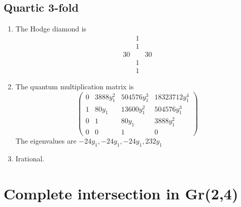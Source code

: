 \documentclass[11pt]{amsart}
\newcounter{num}[section] %
\begin{document}
\subsection{Quartic 3-fold}
\begin{enumerate}
 
\item[1)] The Hodge diamond is 
\[
    \begin{array}{ccc}
         &1&  \\
         &1&\\
         30&&30\\
         &1&\\
         &1&
    \end{array}
\]

\item[2)] The quantum multiplication matrix is
\[
    \begin{pmatrix}
        0& 3888y_{1}^{2} &504576y_{1}^{3} &18323712y_{1}^{4}\\
        1&80y_1 &13600y_{1}^{2} &504576y_{1}^{3}\\
        0& 1 &80y_1&3888y_{1}^{2}\\
        0&0&1&0
    \end{pmatrix}
 \]
 The eigenvalues are $-24y_1,-24y_1,-24y_1,232y_1$
 \item[3)] Irational. 
\end{enumerate}

\section{Complete intersection in Gr(2,4)}
\end{document}
